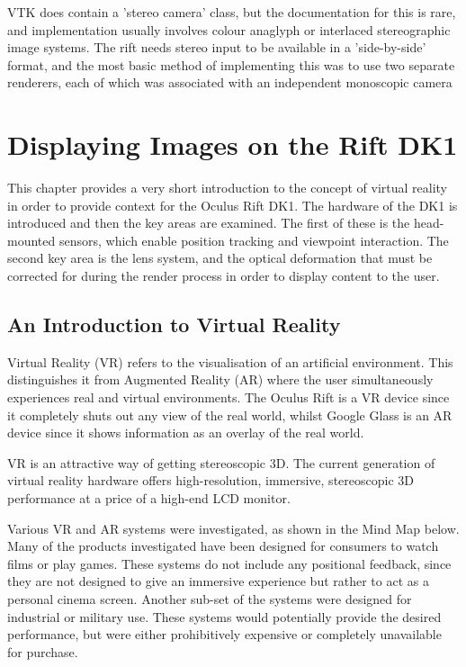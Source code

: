 \documentclass[MSc,paper=a4,pagesize=auto]{icldt}
\begin{document}
VTK does contain a 'stereo camera' class, but the documentation for this is rare, and implementation usually involves colour anaglyph or interlaced stereographic image systems. The rift needs stereo input to be available in a 'side-by-side' format, and the most basic method of implementing this was to use two separate renderers, each of which was associated with an independent monoscopic camera 

\chapter{Displaying Images on the Rift DK1}
This chapter provides a very short introduction to the concept of virtual reality in order to provide context for the Oculus Rift DK1. The hardware of the DK1 is introduced and then the key areas are examined. The first of these is the head-mounted sensors, which enable position tracking and viewpoint interaction. The second key area is the lens system, and the optical deformation that must be corrected for during the render process in order to display content to the user. 

\section{An Introduction to Virtual Reality}
Virtual Reality (VR) refers to the visualisation of an artificial environment. This distinguishes it from Augmented Reality (AR) where the user simultaneously experiences real and virtual environments. The Oculus Rift is a VR device since it completely shuts out any view of the real world, whilst Google Glass is an AR device since it shows information as an overlay of the real world.

VR is an attractive way of getting stereoscopic 3D. The current generation of virtual reality hardware offers high-resolution, immersive, stereoscopic 3D performance at a price of a high-end LCD monitor. 

Various VR and AR systems were investigated, as shown in the Mind Map below. Many of the products investigated have been designed for consumers to watch films or play games. These systems do not include any positional feedback, since they are not designed to give an immersive experience but rather to act as a personal cinema screen. Another sub-set of the systems were designed for industrial or military use. These systems would potentially provide the desired performance, but were either prohibitively expensive or completely unavailable for purchase. 
\end{document}
